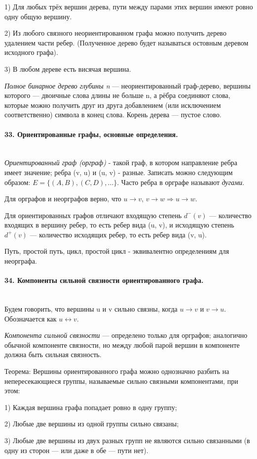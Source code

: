 \documentclass[a4paper, 12pt]{article}
\newcommand{\parag}[1]{\paragraph{#1}\mbox{}\\}
\begin{document}
1) Для любых трёх вершин дерева, пути между парами этих вершин имеют ровно одну общую вершину. 

2) Из любого связного неориентированном графа можно получить дерево удалением части ребер. (Полученное дерево будет называться остовным деревом исходного графа). 

3) В любом дереве есть висячая вершина.

\vskip 0.2in

\noindent
\textit{Полное бинарное дерево глубины n} — неориентированный граф-дерево, вершины которого — двоичные слова длины не больше n, а рёбра соединяют слова, которые можно получить друг из друга добавлением (или исключением соответственно) символа в конец слова. Корень дерева — пустое слово.


\parag{33. Ориентированные графы, основные определения.}
\textit{Ориентированный граф (орграф)} - такой граф, в котором направление ребра имеет значение; ребра (v, u) и (u, v) - разные. Записать можно следующим образом: $E = \{(A, B), (C, D), ...\}$. Часто ребра в орграфе называют \textit{дугами}. 

\noindent
Для орграфов и неорграфов верно, что $u \rightarrow v$, $v \rightarrow w \Rightarrow u \rightarrow w$. 

\noindent
Для ориентированных графов отличают входящую степень $d^{-}(v)$ — количество входящих в вершину ребер, то есть ребер вида (u, v), и исходящую степень $d^{+}(v)$ — количество исходящих ребер, то есть ребер вида (v, u).

\noindent
Путь, простой путь, цикл, простой цикл - эквивалентно определениям для неорграфа.

\parag{34. Компоненты сильной связности ориентированного графа.}
Будем говорить, что вершины u и v сильно связны, когда $u \rightarrow v$ и $v \rightarrow u$. Обозначается как $u \leftrightarrow v$.

\noindent
\textit{Компонента сильной связности} — определено только для орграфов; аналогично обычной компоненте связности, но между любой парой вершин в компоненте должна быть сильная связность. 

\noindent
Теорема: Вершины ориентированного графа можно однозначно разбить на непересекающиеся группы, называемые сильно связными компонентами, при этом:

1) Каждая вершина графа попадает ровно в одну группу;

2) Любые две вершины из одной группы сильно связаны;

3) Любые две вершины из двух разных групп не являются сильно связанными (в одну из сторон — или даже в обе — пути нет).
\end{document}
